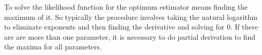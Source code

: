 \documentclass[12pt]{article}
\begin{document}
	\noindent To solve the likelihood function for the optimum estimator means finding the maximum of it. So typically the procedure involves taking the natural logarithm to eliminate exponents and then finding the derivative and solving for 0. If there are are more than one parameter, it is necessary to do partial derivation to find the maxima for all parameters.
	
\end{document}
